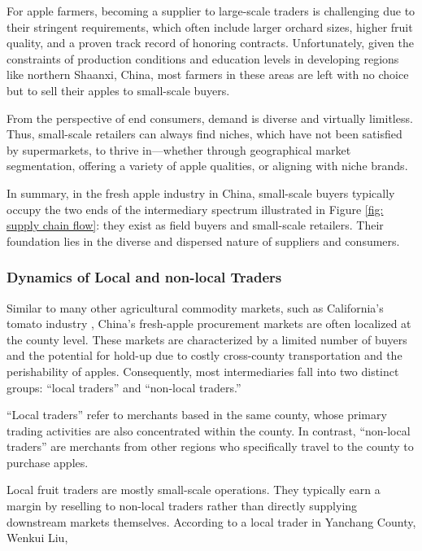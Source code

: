 For apple farmers, becoming a supplier to large-scale traders is challenging due to their stringent requirements, which often include larger orchard sizes, higher fruit quality, and a proven track record of honoring contracts. Unfortunately, given the constraints of production conditions and education levels in developing regions like northern Shaanxi, China, most farmers in these areas are left with no choice but to sell their apples to small-scale buyers.

From the perspective of end consumers, demand is diverse and virtually limitless. Thus, small-scale retailers can always find niches, which have not been satisfied by supermarkets, to thrive in—whether through geographical market segmentation, offering a variety of apple qualities, or aligning with niche brands.

In summary, in the fresh apple industry in China, small-scale buyers typically occupy the two ends of the intermediary spectrum illustrated in Figure \ref{fig: supply chain flow}: they exist as field buyers and small-scale retailers. Their foundation lies in the diverse and dispersed nature of suppliers and consumers.




\subsubsection{Dynamics of Local and non-local Traders \label{Section: intro of Local and non-local traders}}
Similar to many other agricultural commodity markets, such as California's tomato industry \citep{hamilton2024spatial}, China's fresh-apple procurement markets are often localized at the county level. These markets are characterized by a limited number of buyers and the potential for hold-up due to costly cross-county transportation and the perishability of apples. Consequently, most intermediaries fall into two distinct groups: ``local traders'' and ``non-local traders.''  

``Local traders'' refer to merchants based in the same county, whose primary trading activities are also concentrated within the county. In contrast, ``non-local traders'' are merchants from other regions who specifically travel to the county to purchase apples.  

Local fruit traders are mostly small-scale operations. They typically earn a margin by reselling to non-local traders rather than directly supplying downstream markets themselves. According to a local trader in Yanchang County, Wenkui Liu, 

